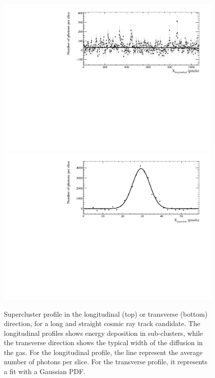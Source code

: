 \begin{itemize}
    \begin{figure}[ht]
      \begin{center}
        \includegraphics[width=0.90\linewidth]{figures/pic_run02156_ev631_cluster1_longprofile} \\
        \includegraphics[width=0.90\linewidth]{figures/pic_run02156_ev631_cluster1_latprofile}
        \caption{Supercluster profile in the longitudinal (top) or
          transverse (bottom) direction, for a long and straight
          cosmic ray track candidate. The longitudinal profiles shows
          energy deposition in sub-clusters, while the transverse
          direction shows the typical width of the diffusion in the
          gas. For the longitudinal profile, the line represent the
          average number of photons per slice. For the transverse
          profile, it represents a fit with a Gaussian
          PDF. \label{fig:profiles}}
      \end{center}
    \end{figure}


\end{itemize}
